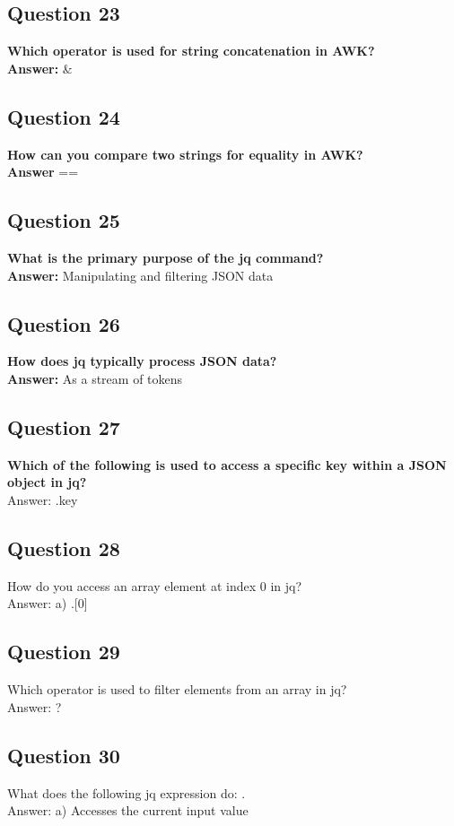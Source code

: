\documentclass[11pt,parskip]{scrartcl}
\begin{document}
\subsection*{Question 23}
\textbf{Which operator is used for string concatenation in AWK?} \\
\textbf{Answer:} \&

\subsection*{Question 24}
\textbf{How can you compare two strings for equality in AWK?} \\
\textbf{Answer} ==

\subsection*{Question 25}
\textbf{What is the primary purpose of the jq command?}\\
\textbf{Answer:} Manipulating and filtering JSON data

\subsection*{Question 26}
\textbf{How does jq typically process JSON data?} \\
\textbf{Answer:} As a stream of tokens

\subsection*{Question 27}
\textbf{Which of the following is used to access a specific key within a JSON object in jq?} \\
Answer: .key

\subsection*{Question 28}
How do you access an array element at index 0 in jq? \\
Answer: a) .[0]

\subsection*{Question 29}
Which operator is used to filter elements from an array in jq? \\
Answer: ?

\subsection*{Question 30}
What does the following jq expression do: . \\
Answer: a) Accesses the current input value
\end{document}
